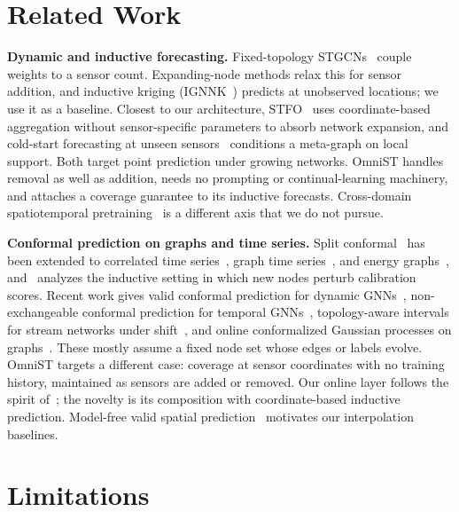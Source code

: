 \documentclass[journal]{IEEEtran}
\begin{document}
\section{Related Work}
\label{sec:related}

\textbf{Dynamic and inductive forecasting.} Fixed-topology STGCNs~\cite{yu2018stgcn} couple weights to
a sensor count. Expanding-node methods relax this for sensor addition, and inductive kriging
(IGNNK~\cite{ignnk2020}) predicts at unobserved locations; we use it as a baseline. Closest to our
architecture, STFO~\cite{stfo2026} uses coordinate-based aggregation without sensor-specific
parameters to absorb network expansion, and cold-start forecasting at unseen
sensors~\cite{coldstart_unseen2026} conditions a meta-graph on local support. Both target point
prediction under growing networks. OmniST handles removal as well as addition, needs no prompting or
continual-learning machinery, and attaches a coverage guarantee to its inductive forecasts.
Cross-domain spatiotemporal pretraining~\cite{dambast2026} is a different axis that we do not pursue.

\textbf{Conformal prediction on graphs and time series.} Split
conformal~\cite{vovk2005algorithmic,angelopoulos2023conformal} has been extended to correlated time
series~\cite{corel2025}, graph time series~\cite{conformalgraphts2026}, and energy
graphs~\cite{incontextresidual2026}, and~\cite{conformalinductivegnn2024} analyzes the inductive
setting in which new nodes perturb calibration scores. Recent work gives valid conformal prediction
for dynamic GNNs~\cite{validcpdyngnn2024}, non-exchangeable conformal prediction for temporal
GNNs~\cite{nonexchcptgnn2025}, topology-aware intervals for stream networks under
shift~\cite{staci2025}, and online conformalized Gaussian processes on graphs~\cite{conformalgp_online2025}.
These mostly assume a fixed node set whose edges or labels evolve. OmniST targets a different case:
coverage at sensor coordinates with no training history, maintained as sensors are added or removed.
Our online layer follows the spirit of~\cite{conformalgp_online2025,staci2025}; the novelty is its
composition with coordinate-based inductive prediction. Model-free valid spatial
prediction~\cite{validspatial2020} motivates our interpolation baselines.

\section{Limitations}
\label{sec:limitations}
\end{document}

